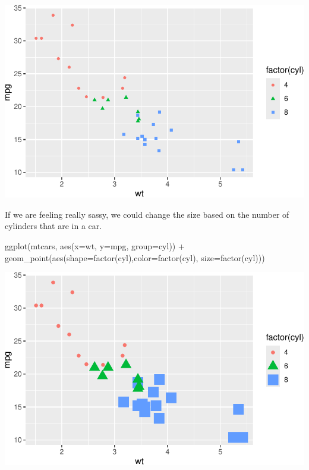 \documentclass[
  letterpaper,
  DIV=11,
  numbers=noendperiod]{scrreprt}
\newenvironment{Shaded}{\begin{snugshade}}{\end{snugshade}}
\newcommand{\AttributeTok}[1]{\textcolor[rgb]{0.40,0.45,0.13}{#1}}
\newcommand{\FunctionTok}[1]{\textcolor[rgb]{0.28,0.35,0.67}{#1}}
\newcommand{\NormalTok}[1]{\textcolor[rgb]{0.00,0.23,0.31}{#1}}
\newcommand{\SpecialCharTok}[1]{\textcolor[rgb]{0.37,0.37,0.37}{#1}}
\begin{document}
\includegraphics{Advanced_Scatterplot_Techniques_files/figure-pdf/unnamed-chunk-10-1.pdf}

If we are feeling really sassy, we could change the size based on the
number of cylinders that are in a car.

\begin{Shaded}
\begin{Highlighting}[]
\FunctionTok{ggplot}\NormalTok{(mtcars, }\FunctionTok{aes}\NormalTok{(}\AttributeTok{x=}\NormalTok{wt, }\AttributeTok{y=}\NormalTok{mpg, }\AttributeTok{group=}\NormalTok{cyl)) }\SpecialCharTok{+}
  \FunctionTok{geom\_point}\NormalTok{(}\FunctionTok{aes}\NormalTok{(}\AttributeTok{shape=}\FunctionTok{factor}\NormalTok{(cyl),}\AttributeTok{color=}\FunctionTok{factor}\NormalTok{(cyl), }\AttributeTok{size=}\FunctionTok{factor}\NormalTok{(cyl)))}
\end{Highlighting}
\end{Shaded}

\includegraphics{Advanced_Scatterplot_Techniques_files/figure-pdf/unnamed-chunk-11-1.pdf}
\end{document}
